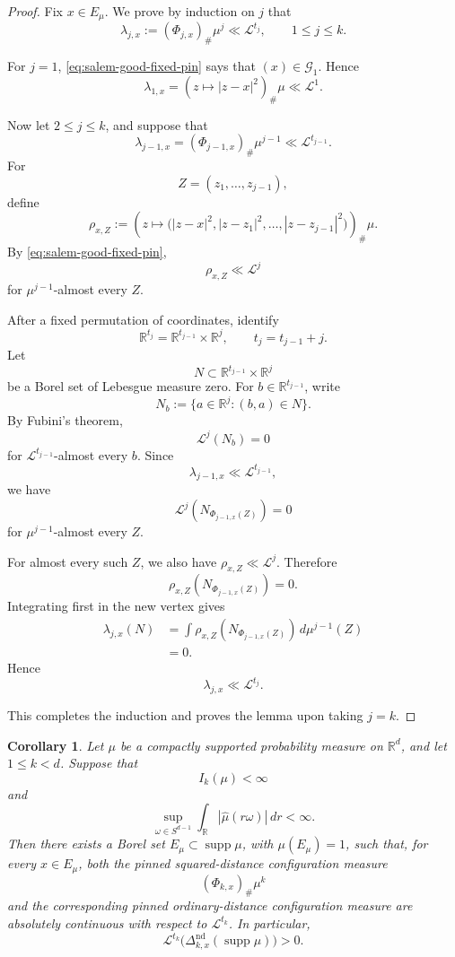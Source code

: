 \documentclass[11pt]{article}
\newtheorem{corollary}[theorem]{Corollary}
\theoremstyle{remark}
\newcommand{\R}{\mathbb R}
\newcommand{\cL}{\mathcal L}
\newcommand{\supp}{\operatorname{supp}}
\numberwithin{equation}{section}
\newcommand{\1}{\mathbf 1}
\begin{document}
\begin{proof}
Fix \(x\in E_\mu\). We prove by induction on \(j\) that
\[
\lambda_{j,x}
:=
(\Phi_{j,x})_\#\mu^j
\ll
\cL^{t_j},
\qquad 1\leq j\leq k.
\]

For \(j=1\), \eqref{eq:salem-good-fixed-pin} says that
\((x)\in\mathcal G_1\). Hence
\[
\lambda_{1,x}
=
\left(
z\longmapsto |z-x|^2
\right)_\#\mu
\ll
\cL^1.
\]

Now let \(2\leq j\leq k\), and suppose that
\[
\lambda_{j-1,x}
=
(\Phi_{j-1,x})_\#\mu^{j-1}
\ll
\cL^{t_{j-1}}.
\]
For
\[
Z=(z_1,\ldots,z_{j-1}),
\]
define
\[
\rho_{x,Z}
:=
\left(
z\longmapsto
\bigl(
|z-x|^2,
|z-z_1|^2,
\ldots,
|z-z_{j-1}|^2
\bigr)
\right)_\#\mu.
\]
By \eqref{eq:salem-good-fixed-pin},
\[
\rho_{x,Z}\ll\cL^j
\]
for \(\mu^{j-1}\)-almost every \(Z\).

After a fixed permutation of coordinates, identify
\[
\R^{t_j}
=
\R^{t_{j-1}}\times\R^j,
\qquad
t_j=t_{j-1}+j.
\]
Let
\[
N\subset\R^{t_{j-1}}\times\R^j
\]
be a Borel set of Lebesgue measure zero. For
\(b\in\R^{t_{j-1}}\), write
\[
N_b
:=
\{a\in\R^j:(b,a)\in N\}.
\]
By Fubini's theorem,
\[
\cL^j(N_b)=0
\]
for \(\cL^{t_{j-1}}\)-almost every \(b\). Since
\[
\lambda_{j-1,x}\ll\cL^{t_{j-1}},
\]
we have
\[
\cL^j
\left(
N_{\Phi_{j-1,x}(Z)}
\right)
=0
\]
for \(\mu^{j-1}\)-almost every \(Z\).

For almost every such \(Z\), we also have
\(\rho_{x,Z}\ll\cL^j\). Therefore
\[
\rho_{x,Z}
\left(
N_{\Phi_{j-1,x}(Z)}
\right)
=0.
\]
Integrating first in the new vertex gives
\[
\begin{aligned}
\lambda_{j,x}(N)
&=
\int
\rho_{x,Z}
\left(
N_{\Phi_{j-1,x}(Z)}
\right)
\,d\mu^{j-1}(Z)\\
&=0.
\end{aligned}
\]
Hence
\[
\lambda_{j,x}\ll\cL^{t_j}.
\]

This completes the induction and proves the lemma upon taking \(j=k\).
\end{proof}



\begin{corollary}
\label{cor:pinned-measure-criterion}
Let \(\mu\) be a compactly supported probability measure on
\(\R^d\), and let \(1\leq k<d\). Suppose that
\[
I_k(\mu)<\infty
\]
and
\begin{equation}
\sup_{\omega\in S^{d-1}}
\int_{\R}
|\widehat{\mu}(r\omega)|\,dr
<\infty.
\label{eq:line-fourier-condition}
\end{equation}
Then there exists a Borel set
\(E_\mu\subset\supp\mu\), with \(\mu(E_\mu)=1\), such that, for every
\(x\in E_\mu\), both the pinned squared-distance configuration measure
\[
(\Phi_{k,x})_\#\mu^k
\]
and the corresponding pinned ordinary-distance configuration measure
are absolutely continuous with respect to \(\cL^{t_k}\). In
particular,
\[
\cL^{t_k}
\bigl(
\Delta^{\mathrm{nd}}_{k,x}(\supp\mu)
\bigr)>0.
\]
\end{corollary}
\end{document}
